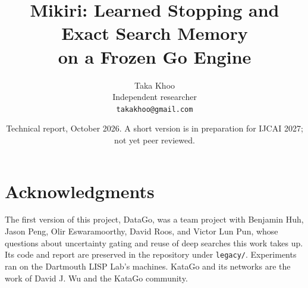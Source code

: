 \documentclass[11pt]{article}
\title{Mikiri: Learned Stopping and Exact Search Memory\\ on a Frozen Go Engine}
\author{Taka Khoo\\[2pt]
Independent researcher\\
\texttt{takakhoo@gmail.com}}
\date{Technical report, October 2026. A short version is in preparation for IJCAI 2027; not yet peer reviewed.}
\begin{document}
\maketitle












\section*{Acknowledgments}
The first version of this project, DataGo, was a team project with Benjamin Huh, Jason Peng, Olir Eswaramoorthy, David Roos, and Victor Lun Pun, whose questions about uncertainty gating and reuse of deep searches this work takes up. Its code and report are preserved in the repository under \texttt{legacy/}. Experiments ran on the Dartmouth LISP Lab's machines. KataGo and its networks are the work of David J. Wu and the KataGo community.





\end{document}
